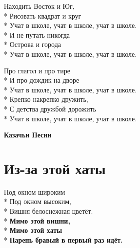 \medskip

\begin{minipage}{\linewidth}
Находить Восток и Юг,\\*
Рисовать квадрат и круг\\*
\hspace*{1.5em}Учат в школе, учат в школе, учат в школе.\\*
И не путать никогда\\*
Острова и города\\*
\hspace*{1.5em}Учат в школе, учат в школе, учат в школе.\\
\end{minipage}\par\medskip\nobreak

\medskip

\begin{minipage}{\linewidth}
Про глагол и про тире\\*
И про дождик на дворе\\*
\hspace*{1.5em}Учат в школе, учат в школе, учат в школе.\\*
Крепко-накрепко дружить,\\*
С детства дружбой дорожить\\*
\hspace*{1.5em}Учат в школе, учат в школе, учат в школе.\\
\end{minipage}

\vspace{\fill}\newpage

\cleardoublepage
\thispagestyle{empty}
\vspace*{\fill}
{\centering\huge\bfseries Казачьи Песни\par}
\vspace*{\fill}
\newpage
\section{Из-за этой хаты}
\label{song:Из-за_этой_хаты}

\medskip

\begin{minipage}{\linewidth}
Под окном широким\\*
Под окном высоким,\\*
Вишня белоснежная цветёт.\\*
\textbf{Мимо этой вишни,}\\*
\textbf{Мимо этой хаты}\\*
\textbf{Парень бравый в первый раз идёт.}\\
\end{minipage}\par\medskip\nobreak

